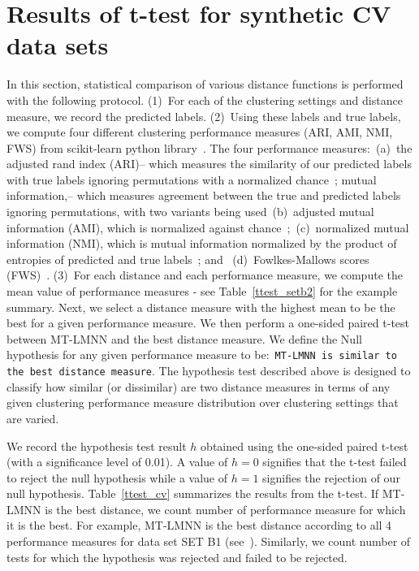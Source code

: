 \section{Results of t-test for synthetic CV data sets}
In this section, statistical comparison of various distance functions is performed with the following protocol. (1)~For each of the clustering settings and distance measure, we record the predicted labels. (2)~Using these labels and true labels, we compute four different clustering performance measures (ARI, AMI, NMI, FWS) from scikit-learn python library~\cite{sklearn}. 
The four performance measures:~(a)~the adjusted rand index (ARI)-- which measures the similarity of our predicted labels  with  true  labels  ignoring permutations with a normalized chance~\cite{santos2009use}; mutual information,-- which measures agreement between the true and predicted labels ignoring permutations, with two variants being used~(b)~adjusted mutual information (AMI), which is normalized against chance~\cite{hubert1985comparing};~(c)~normalized  mutual  information (NMI),  which is mutual information normalized  by the product  of  entropies  of predicted and true labels~\cite{strehl2002cluster,vinh2010information}; and ~(d)~Fowlkes-Mallows scores (FWS)~\cite{fowlkes1983method}.
(3)~For each distance and each performance measure, we compute the mean value of performance measures - see Table~\ref{ttest_setb2} for the example summary. Next, we select a distance measure with the highest mean to be the best for a given performance measure.
We then perform a one-sided paired t-test between MT-LMNN and the best distance measure. 
We define the Null hypothesis for any given performance measure to be:~\texttt{MT-LMNN is similar to the best distance measure}.
The hypothesis test described above is designed to classify how similar (or dissimilar) are two distance measures in terms of any given clustering performance measure distribution over clustering settings that are varied.  

We record the hypothesis test result $h$ obtained using the one-sided paired t-test (with a significance level of 0.01). 
A value of \(h=0\) signifies that the t-test failed to reject the null hypothesis while a value of \(h=1\) signifies the rejection of our null hypothesis.
Table~\ref{ttest_cv} summarizes the results from the t-test. If MT-LMNN is the best distance, we count number of performance measure for which it is the best. For example, MT-LMNN is the best distance according to all 4 performance measures for data set SET B1 (see~). Similarly, we count number of tests for which the hypothesis was rejected and failed to be rejected.  

